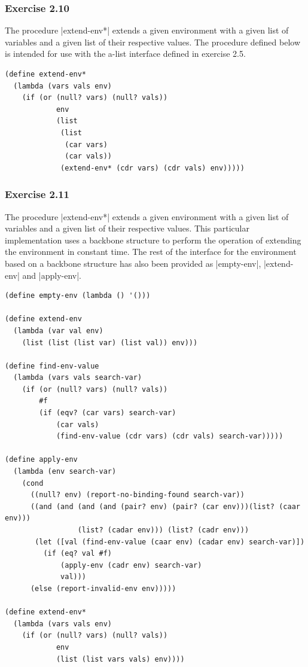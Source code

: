 \documentclass[a4paper]{article}
\begin{document}
\subsubsection{Exercise 2.10}

The procedure |extend-env*| extends a given environment with a given list of variables and a given list of their respective values. The procedure defined below is intended for use with the a-list interface defined in exercise 2.5.

\begin{lstlisting}
(define extend-env*
  (lambda (vars vals env)
    (if (or (null? vars) (null? vals))
            env
            (list
             (list
              (car vars)
              (car vals))
             (extend-env* (cdr vars) (cdr vals) env)))))
\end{lstlisting}

\subsubsection{Exercise 2.11}

The procedure |extend-env*| extends a given environment with a given list of variables and a given list of their respective values. This particular implementation uses a backbone structure to perform the operation of extending the environment in constant time. The rest of the interface for the environment based on a backbone structure has also been provided as |empty-env|, |extend-env| and |apply-env|.

\begin{lstlisting}
(define empty-env (lambda () '()))

(define extend-env
  (lambda (var val env)
    (list (list (list var) (list val)) env)))

(define find-env-value
  (lambda (vars vals search-var)
    (if (or (null? vars) (null? vals))
        #f
        (if (eqv? (car vars) search-var)
            (car vals)
            (find-env-value (cdr vars) (cdr vals) search-var)))))

(define apply-env
  (lambda (env search-var)
    (cond
      ((null? env) (report-no-binding-found search-var))
      ((and (and (and (and (pair? env) (pair? (car env)))(list? (caar env)))
                 (list? (cadar env))) (list? (cadr env)))
       (let ([val (find-env-value (caar env) (cadar env) search-var)])
         (if (eq? val #f)
             (apply-env (cadr env) search-var)
             val)))
      (else (report-invalid-env env)))))
      
(define extend-env*
  (lambda (vars vals env)
    (if (or (null? vars) (null? vals))
            env
            (list (list vars vals) env))))
\end{lstlisting}
\end{document}
